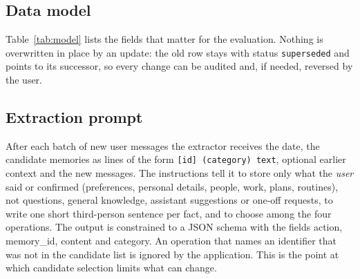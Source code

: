 \IfFileExists{IEEEtran.cls}{\documentclass[journal]{IEEEtran}\def\HAVEIEEE{1}}{\documentclass[10pt,twocolumn]{article}\usepackage[margin=0.7in,columnsep=0.25in]{geometry}}
\begin{document}
\subsection{Data model}
Table~\ref{tab:model} lists the fields that matter for the evaluation. Nothing is overwritten in place by an update: the old row stays with status \texttt{superseded} and points to its successor, so every change can be audited and, if needed, reversed by the user.

\begin{table}[t]
\centering\footnotesize
\caption{Memory and proposal records.}
\label{tab:model}
\end{table}

\subsection{Extraction prompt}
After each batch of new user messages the extractor receives the date, the candidate memories as lines of the form \texttt{[id] (category) text}, optional earlier context and the new messages. The instructions tell it to store only what the \emph{user} said or confirmed (preferences, personal details, people, work, plans, routines), not questions, general knowledge, assistant suggestions or one-off requests, to write one short third-person sentence per fact, and to choose among the four operations. The output is constrained to a JSON schema with the fields action, memory\_id, content and category. An operation that names an identifier that was not in the candidate list is ignored by the application. This is the point at which candidate selection limits what can change.
\end{document}
